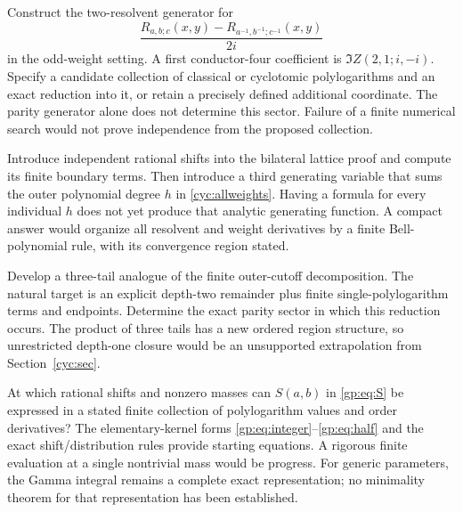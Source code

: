 \begin{question}
Construct the two-resolvent generator for
\[
 \frac{R_{a,b;c}(x,y)-R_{a^{-1},b^{-1};c^{-1}}(x,y)}{2i}
\]
in the odd-weight setting. A first conductor-four coefficient is
$\Im Z(2,1;i,-i)$. Specify a candidate collection of classical or
cyclotomic polylogarithms and an exact reduction into it, or retain a
precisely defined additional coordinate. The parity generator alone
does not determine this sector. Failure of a finite numerical search
would not prove independence from the proposed collection.
\end{question}

\begin{question}
Introduce independent rational shifts into the bilateral lattice proof
and compute its finite boundary terms. Then introduce a third generating
variable that sums the outer polynomial degree $h$ in
\eqref{cyc:allweights}. Having a formula for every individual $h$ does
not yet produce that analytic generating function. A compact answer
would organize all resolvent and weight derivatives by a finite
Bell-polynomial rule, with its convergence region stated.
\end{question}

\begin{question}
Develop a three-tail analogue of the finite outer-cutoff decomposition.
The natural target is an explicit depth-two remainder plus finite
single-polylogarithm terms and endpoints. Determine the exact parity
sector in which this reduction occurs. The product of three tails
has a new ordered region structure, so unrestricted depth-one closure
would be an unsupported extrapolation from Section~\ref{cyc:sec}.
\end{question}

\begin{question}
At which rational shifts and nonzero masses can $S(a,b)$ in
\eqref{gp:eq:S} be expressed in a stated finite collection of
polylogarithm values and order derivatives? The elementary-kernel
forms \eqref{gp:eq:integer}--\eqref{gp:eq:half} and the exact
shift/distribution rules provide starting equations. A rigorous
finite evaluation at a single nontrivial mass would be progress.
For generic parameters, the Gamma integral remains a complete exact
representation; no minimality theorem for that representation has
been established.
\end{question}


